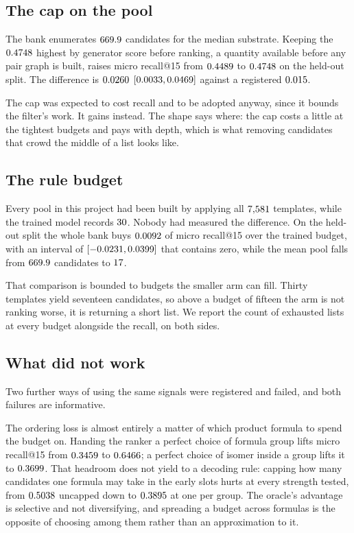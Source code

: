 \documentclass[11pt]{article}
\begin{document}
\subsection{The cap on the pool}
\label{sec:cap}

The bank enumerates $669.9$ candidates for the median substrate. Keeping the
$0.4748$ highest by generator score before ranking, a quantity available before any pair
graph is built, raises micro recall@15 from $0.4489$ to $0.4748$ on the
held-out split. The difference is $0.0260$ $[0.0033, 0.0469]$ against a
registered $0.015$.

The cap was expected to cost recall and to be adopted anyway, since it bounds the filter's work.
It gains instead. The shape says where: the cap costs a little at the tightest budgets and pays
with depth, which is what removing candidates that crowd the middle of a list looks like.

\subsection{The rule budget}

Every pool in this project had been built by applying all $7{,}581$ templates, while the
trained model records $30$. Nobody had measured the difference. On the held-out split the
whole bank buys $0.0092$ of micro recall@15 over the trained budget, with an interval of
$[-0.0231, 0.0399]$ that contains zero, while the mean pool falls from
$669.9$ candidates to $17$.

That comparison is bounded to budgets the smaller arm can fill. Thirty templates yield seventeen
candidates, so above a budget of fifteen the arm is not ranking worse, it is returning a short
list. We report the count of exhausted lists at every budget alongside the recall, on both sides.

\subsection{What did not work}

Two further ways of using the same signals were registered and failed, and both failures are
informative.

The ordering loss is almost entirely a matter of which product formula to spend the budget on.
Handing the ranker a perfect choice of formula group lifts micro recall@15 from
$0.3459$ to $0.6466$; a perfect choice of isomer inside a group lifts it to
$0.3699$. That headroom does not yield to a decoding rule: capping how many candidates
one formula may take in the early slots hurts at every strength tested, from
$0.5038$ uncapped down to $0.3895$ at one per group. The oracle's advantage is
selective and not diversifying, and spreading a budget across formulas is the opposite of choosing
among them rather than an approximation to it.
\end{document}
